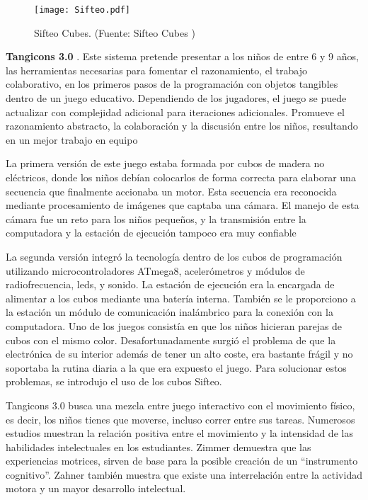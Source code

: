 \begin{figure}[!h]
\begin{center}
\texttt{[image: Sifteo.pdf]}
\caption{Sifteo Cubes. (Fuente: Sifteo Cubes \cite{Merrill})}
\label{fig:Sifteo}
\end{center}
\end{figure}

\textbf{Tangicons 3.0} \cite{Tangicons}. Este sistema pretende presentar a los niños de entre 6 y 9 años, las herramientas necesarias para fomentar el razonamiento, el trabajo colaborativo, en los primeros pasos de la programación con objetos tangibles dentro de un juego educativo. Dependiendo de los jugadores, el juego se puede actualizar con complejidad adicional para iteraciones adicionales. Promueve el razonamiento abstracto, la colaboración y la discusión entre los niños, resultando en un mejor trabajo en equipo

La primera versión de este juego estaba formada por cubos de madera no eléctricos, donde los niños debían colocarlos de forma correcta para elaborar una secuencia que finalmente accionaba un motor. Esta secuencia era reconocida mediante procesamiento de imágenes que captaba una cámara. El manejo de esta cámara fue un reto para los niños pequeños, y la transmisión entre la computadora y la estación de ejecución tampoco era muy confiable

La segunda versión integró la tecnología dentro de los cubos de programación utilizando microcontroladores ATmega8, acelerómetros y módulos de radiofrecuencia, leds, y sonido. La estación de ejecución era la encargada de alimentar a los cubos mediante una batería interna. También se le proporciono a la estación un módulo de comunicación inalámbrico para la conexión con la computadora. Uno de los juegos consistía en que los niños hicieran parejas de cubos con el mismo color. Desafortunadamente surgió el problema de que la electrónica de su interior además de tener un alto coste, era bastante frágil y no soportaba la rutina diaria a la que era expuesto el juego. Para solucionar estos problemas, se introdujo el uso de los cubos Sifteo.

Tangicons 3.0 busca una mezcla entre juego interactivo con el movimiento físico, es decir, los niños tienes que moverse, incluso correr entre sus tareas. Numerosos estudios muestran la relación positiva entre el movimiento y la intensidad de las habilidades intelectuales en los estudiantes. Zimmer \cite{Zimmer} demuestra  que las experiencias motrices, sirven de base para la posible creación de un “instrumento cognitivo”. Zahner \cite{Zahner} también muestra que existe una interrelación entre la actividad motora y un mayor desarrollo intelectual.

